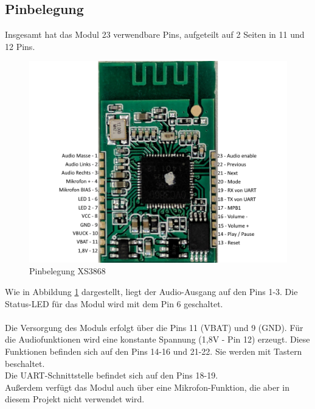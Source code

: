 
\subsection*{Pinbelegung} \label{subsec:5.3.4}
Insgesamt hat das Modul 23 verwendbare Pins, aufgeteilt auf 2 Seiten in 11 und 12 Pins.
\begin{figure} [H]
	\centering
	\includegraphics[width=1\textwidth]{img/BTModul/XS3868_Pinbelegung.png}
	\caption{Pinbelegung XS3868}\label {fig:5.3.4.1}
\end{figure}
Wie in Abbildung \ref{fig:5.3.4.1} dargestellt, liegt der Audio-Ausgang auf den Pins 1-3.
Die Status-LED für das Modul wird mit dem Pin 6 geschaltet.
\\ \\
Die Versorgung des Moduls erfolgt über die Pins 11 (VBAT) und 9 (GND).
Für die Audiofunktionen wird eine konstante Spannung (1,8V - Pin 12) erzeugt.
Diese Funktionen befinden sich auf den Pins 14-16 und 21-22.
Sie werden mit Tastern beschaltet.
\\
Die UART-Schnittstelle befindet sich auf den Pins 18-19.
\\
Außerdem verfügt das Modul auch über eine Mikrofon-Funktion, die aber in diesem Projekt nicht verwendet wird.
\newpage


